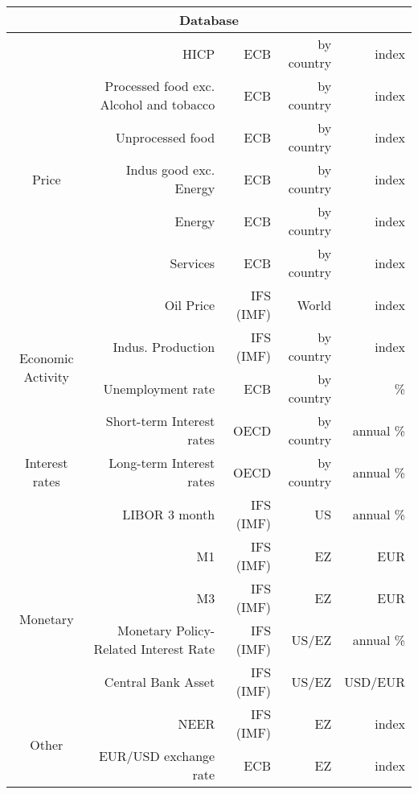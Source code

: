 \documentclass[11pt,a4paper]{article}
\author{clément carrier}
\begin{document}
\begin{table}[h]
 
    \begin{tabular}{crrrr}
    \toprule
    \multicolumn{5}{c}{Database}
      \\
    \midrule
    \multirow{7}[14]{*}{Price} &
      HICP  &
      ECB &
      by country &
      index
      \\
     &
      Processed food exc. Alcohol and tobacco &
      ECB &
      by country &
      index
      \\
     &
      Unprocessed food &
      ECB &
      by country &
      index
      \\
     &
      Indus good exc. Energy &
      ECB &
      by country &
      index
      \\
     &
      Energy &
      ECB &
      by country &
      index
      \\
     &
      Services &
      ECB &
      by country &
      index
      \\
     &
      Oil Price &
      IFS (IMF) &
      World &
      index
      \\
    \multirow{2}[4]{*}{Economic Activity} &
      Indus. Production &
      IFS (IMF) &
      by country &
      index
      \\
     &
      Unemployment rate &
      ECB &
      by country &
      \%
      \\
    \multirow{3}[6]{*}{Interest rates} &
      Short-term Interest rates &
      OECD &
      by country &
      annual \%
      \\
     &
      Long-term Interest rates &
      OECD &
      by country &
      annual \%
      \\
     &
      LIBOR 3 month &
      IFS (IMF) &
      US &
      annual \%
      \\
    \multirow{4}[8]{*}{Monetary} &
      M1 &
      IFS (IMF) &
      EZ &
      EUR
      \\
     &
      M3 &
      IFS (IMF) &
      EZ &
      EUR
      \\
     &
      Monetary Policy-Related Interest Rate &
      IFS (IMF) &
      US/EZ &
      annual \%
      \\
     &
      Central Bank Asset &
      IFS (IMF) &
      US/EZ &
      USD/EUR
      \\
    \multirow{2}[4]{*}{Other} &
      NEER &
      IFS (IMF) &
      EZ &
      index
      \\
     &
      EUR/USD exchange rate &
      ECB &
      EZ &
      index
      \\
    \bottomrule
    \end{tabular}

\end{table}
\end{document}
